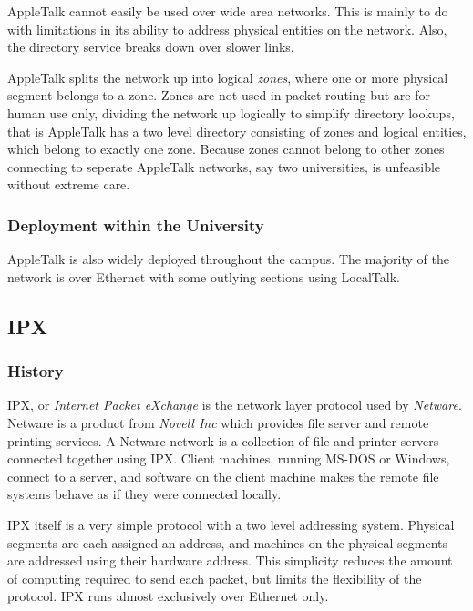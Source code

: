 AppleTalk cannot easily be used over wide area networks.  This is
mainly to do with limitations in its ability to address physical
entities on the network.  Also, the directory service breaks down over
slower links.

AppleTalk splits the network up into logical {\em zones}, where one or
more physical segment belongs to a zone.  Zones are not used in packet
routing but are for human use only, dividing the network up logically
to simplify directory lookups, that is AppleTalk has a two level
directory consisting of zones and logical entities, which belong to
exactly one zone.  Because zones cannot belong to other zones
connecting to seperate AppleTalk networks, say two universities, is
unfeasible without extreme care.

\subsubsection{Deployment within the University}

AppleTalk is also widely deployed throughout the campus.  The majority
of the network is over Ethernet with some outlying sections using
LocalTalk.

\subsection{IPX}

\subsubsection{History}

IPX, or {\em Internet Packet eXchange} is the network layer protocol
used by {\em Netware}.  Netware is a product from {\em Novell Inc}
which provides file server and remote printing services.  A Netware
network is a collection of file and printer servers connected together
using IPX.  Client machines, running MS-DOS or Windows, connect to a
server, and software on the client machine makes the remote file
systems behave as if they were connected locally.

IPX itself is a very simple protocol with a two level addressing
system.  Physical segments are each assigned an address, and machines
on the physical segments are addressed using their hardware address.
This simplicity reduces the amount of computing required to send each
packet, but limits the flexibility of the protocol.  IPX runs almost
exclusively over Ethernet only.


